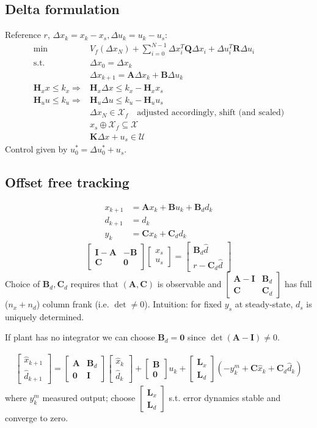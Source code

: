 \documentclass[landscape,a4paper,8pt]{scrartcl}
\newcommand{\mc}[1]{\mathcal{#1}}
\newcommand\vA{\bm{A}}
\newcommand\vB{\bm{B}}
\newcommand\vC{\bm{C}}
\newcommand\vH{\bm{H}}
\newcommand\vI{\bm{I}}
\newcommand\vK{\bm{K}}
\newcommand\vL{\bm{L}}
\newcommand\vQ{\bm{Q}}
\newcommand\vR{\bm{R}}
\newcommand{\Me}[1]{\begin{bmatrix}#1\end{bmatrix}} %
\begin{document}
\begin{multicols*}{3}
\subsection{Delta formulation}
Reference $r$, $\Delta x_k = x_k - x_s, \Delta u_k = u_k - u_s$:
\begin{align*}
\min\ & V_f(\Delta x_N) + \sum_{i=0}^{N-1} \Delta x_i^T\vQ\Delta x_i + \Delta u_i^T \vR \Delta u_i \\
\text{s.t. } & \Delta x_0 = \Delta x_k \\
             & \Delta x_{k+1} = \vA\Delta x_k + \vB \Delta u_k \\ %
\vH_x x \leq k_x \Rightarrow & \vH_x\Delta x \leq k_x - \vH_x x_s \\
\vH_u u \leq k_u \Rightarrow & \vH_u\Delta u \leq k_u - \vH_u u_s \\
                 & \Delta x_N \in \mc X_f \quad \text{adjusted accordingly, shift (and scaled)} \\
								 & x_s \oplus \mc X_f \subseteq \mc X \\
								 & \vK\Delta x + u_s \in \mc U
\end{align*}
Control given by $u_0^* = \Delta u_0^* + u_s$.

\subsection{Offset free tracking}
\begin{align*}
x_{k+1} &= \vA x_k + \vB u_k + \vB_d d_k \\
d_{k+1} &= d_k \\
y_k     &= \vC x_k + \vC_d d_k 
\end{align*}
\[
\Me{\vI-\vA & -\vB \\ \vC & \bm 0}\Me{x_s \\ u_s} = \Me{\vB_d \hat d \\ r - \vC_d \hat d}
\]
Choice of $\vB_d, \vC_d$ requires that $(\vA,\vC)$ is observable and $\Me{\vA-\vI & \vB_d \\ \vC & \vC_d}$ has full ($n_x + n_d$) column frank (i.e. $\det{} \neq 0$).
Intuition: for fixed $y_s$ at steady-state, $d_s$ is uniquely determined.

If plant has no integrator we can choose $\vB_d = \bm 0$ since $\det(\vA-\vI) \neq 0$.

\begin{align*}
\Me{\hat x_{k+1} \\ \hat d_{k+1}} = \Me{\vA & \vB_d \\ \bm 0 & \vI}\Me{\hat x_k \\ \hat d_k} + \Me{\vB \\ \bm 0}u_k + \Me{\vL_x \\ \vL_d}\left(-y_k^m + \vC\hat x_k + \vC_d \hat d_k\right)
\end{align*}
where $y_k^m$ measured output; choose $\Me{\vL_x \\ \vL_d}$ s.t. error dynamics stable and converge to zero.


\end{multicols*}
\end{document}
